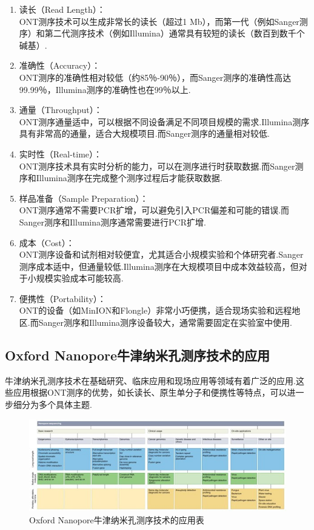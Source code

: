 \begin{enumerate}
	\item 读长（Read Length）：\\
	ONT测序技术可以生成非常长的读长（超过1 Mb），而第一代（例如Sanger测序）和第二代测序技术（例如Illumina）通常具有较短的读长（数百到数千个碱基）.
	
	\item 准确性（Accuracy）：\\
	ONT测序的准确性相对较低（约85％-90％），而Sanger测序的准确性高达99.99％，Illumina测序的准确性也在99％以上.
	
	\item 通量（Throughput）：\\
	ONT测序通量适中，可以根据不同设备满足不同项目规模的需求.Illumina测序具有非常高的通量，适合大规模项目.而Sanger测序的通量相对较低.
	
	\item 实时性（Real-time）：\\
	ONT测序技术具有实时分析的能力，可以在测序进行时获取数据.而Sanger测序和Illumina测序在完成整个测序过程后才能获取数据.
	
	\item 样品准备（Sample Preparation）：\\
	ONT测序通常不需要PCR扩增，可以避免引入PCR偏差和可能的错误.而Sanger测序和Illumina测序通常需要进行PCR扩增.
	
	\item 成本（Cost）：\\
	ONT测序设备和试剂相对较便宜，尤其适合小规模实验和个体研究者.Sanger测序成本适中，但通量较低.Illumina测序在大规模项目中成本效益较高，但对于小规模实验成本可能较高.
	
	\item 便携性（Portability）：\\
	ONT的设备（如MinION和Flongle）非常小巧便携，适合现场实验和远程地区.而Sanger测序和Illumina测序设备较大，通常需要固定在实验室中使用.
\end{enumerate}

\subsection{Oxford Nanopore牛津纳米孔测序技术的应用}
    牛津纳米孔测序技术在基础研究、临床应用和现场应用等领域有着广泛的应用.这些应用根据ONT测序的优势，如长读长、原生单分子和便携性等特点，可以进一步细分为多个具体主题.

\begin{figure}[htp!]
	\centering
	\includegraphics[width=1\linewidth]{figure/ontapp}
	\caption{Oxford Nanopore牛津纳米孔测序技术的应用表 \cite{0wang2021nanopore} } \label{ontapp}
\end{figure}

